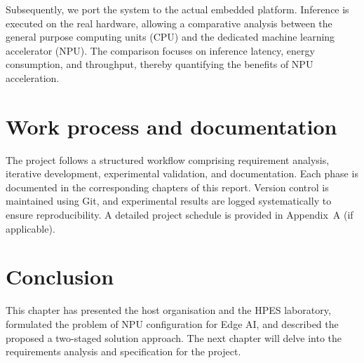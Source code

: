 Subsequently, we port the system to the actual embedded platform. Inference is executed on the real hardware, allowing a comparative analysis between the general purpose computing units (CPU) and the dedicated machine learning accelerator (NPU). The comparison focuses on inference latency, energy consumption, and throughput, thereby quantifying the benefits of NPU acceleration.

\section{Work process and documentation}
The project follows a structured workflow comprising requirement analysis, iterative development, experimental validation, and documentation. Each phase is documented in the corresponding chapters of this report. Version control is maintained using Git, and experimental results are logged systematically to ensure reproducibility. A detailed project schedule is provided in Appendix~A (if applicable).

\section*{Conclusion}
This chapter has presented the host organisation and the HPES laboratory, formulated the problem of NPU configuration for Edge AI, and described the proposed a  two-staged  solution approach. The next chapter will delve into the requirements analysis and specification for the project.